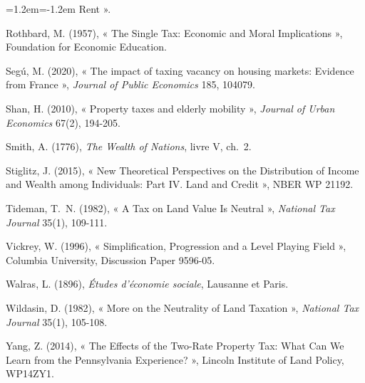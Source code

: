 \documentclass[11pt,a4paper]{article}
\begin{document}
\begin{list}{}{\leftmargin=1.2em\itemindent=-1.2em\itemsep=1pt\parsep=0pt}
Rent ».
\item Rothbard, M. (1957), « The Single Tax: Economic and Moral Implications », Foundation for
Economic Education.
\item Segú, M. (2020), « The impact of taxing vacancy on housing markets: Evidence from France »,
\emph{Journal of Public Economics} 185, 104079.
\item Shan, H. (2010), « Property taxes and elderly mobility », \emph{Journal of Urban Economics}
67(2), 194-205.
\item Smith, A. (1776), \emph{The Wealth of Nations}, livre V, ch.~2.
\item Stiglitz, J. (2015), « New Theoretical Perspectives on the Distribution of Income and Wealth
among Individuals: Part IV. Land and Credit », NBER WP 21192.
\item Tideman, T.~N. (1982), « A Tax on Land Value Is Neutral », \emph{National Tax Journal} 35(1),
109-111.
\item Vickrey, W. (1996), « Simplification, Progression and a Level Playing Field », Columbia
University, Discussion Paper 9596-05.
\item Walras, L. (1896), \emph{Études d'économie sociale}, Lausanne et Paris.
\item Wildasin, D. (1982), « More on the Neutrality of Land Taxation », \emph{National Tax Journal}
35(1), 105-108.
\item Yang, Z. (2014), « The Effects of the Two-Rate Property Tax: What Can We Learn from the
Pennsylvania Experience? », Lincoln Institute of Land Policy, WP14ZY1.
\end{list}
\end{document}
